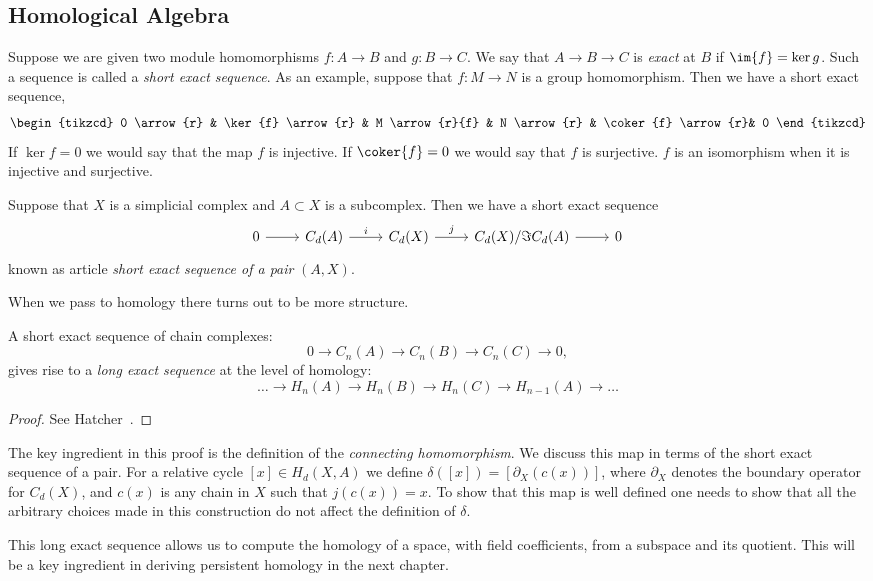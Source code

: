 \subsection{Homological Algebra} 
Suppose we are given two module homomorphisms $f: A \rightarrow B$ and $g: B \rightarrow C$. We say that $A \rightarrow B \rightarrow C$
is \emph{exact} at $B$ if $\im{f} =  \ker{g}$. Such a sequence is called a \emph{short exact sequence}. As an example, suppose that $f: M \rightarrow N$ is a group homomorphism. Then we have a short exact sequence,
\[ 
\begin{tikzcd}
0 \arrow{r} & \ker{f} \arrow{r} & M \arrow{r}{f} & N \arrow{r} & \coker{f} \arrow{r}& 0
\end{tikzcd}
\] 
If $\ker{f} = 0$ we would say that the map $f$ is injective. If $\coker{f} = 0$ we would say that $f$ is surjective. $f$ is an isomorphism when it is injective and surjective. 
\begin{definition}
Suppose that $X$ is a simplicial complex and $A \subset X$ is a subcomplex. Then we have a short exact sequence 
\[
\begin{tikzcd}
0 \arrow{r}& C_d(A) \arrow{r}{i} & C_d(X) \arrow{r}{j} & C_d(X)/\Im{C_d(A)} \arrow{r} & 0 
\end{tikzcd}
\]
known as article \emph{short exact sequence of a pair} $(A,X)$.
\end{definition}
When we pass to homology there turns out to be more structure.
\begin{theorem} 
A short exact sequence of chain complexes: 
\[  0 \rightarrow C_n(A) \rightarrow C_n(B) \rightarrow C_n(C) \rightarrow 0, \]
gives rise to a \emph{long exact sequence} at the level of homology:
\[ \ldots \rightarrow H_n(A) \rightarrow H_n(B) \rightarrow H_n(C) \rightarrow H_{n-1}(A) \rightarrow \ldots  \]  
\end{theorem}
\begin{proof}
See Hatcher~\cite{hatcher}.
\end{proof}
The key ingredient in this proof is the definition of the \emph{connecting homomorphism}. We discuss this map in terms of the short exact sequence of a pair. For a relative cycle $[x] \in H_d(X,A)$ we define $\delta([x]) = [\partial_X(c(x))]$, where $\partial_X$ denotes the boundary operator for $C_d(X)$, and $c(x)$ is any chain in $X$ such that $j(c(x)) = x$. To show that this map is well defined one needs to show that all the arbitrary choices made in this construction do not affect the definition of $\delta$. 
 
This long exact sequence allows us to compute the homology of a space, with field coefficients, from a subspace and its quotient. This will be a key ingredient in deriving persistent homology in the next chapter.